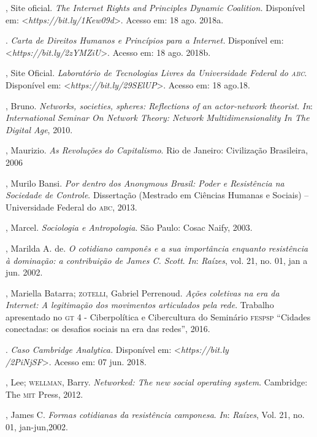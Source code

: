 \begin{bibliohedra}
, Site oficial. \emph{The Internet Rights and Principles Dynamic
Coalition.} Disponível em: \textless{}\emph{https://bit.ly/1Kew09d}\textgreater{}. Acesso em: 18 ago. 2018a.

\titidem. \emph{Carta de Direitos Humanos e Princípios para
a Internet.} Disponível em: \textless{}\emph{https://bit.ly/2zYMZiU}\textgreater{}. Acesso em: 18 ago. 2018b.

, Site Oficial. \emph{Laboratório de Tecnologias Livres da
Universidade Federal do \textsc{abc}}. Disponível em: \textless{}\emph{https://bit.ly/29SElUP}\textgreater{}. Acesso em: 18 ago.18.

, Bruno. \emph{Networks, societies, spheres: Reflections of an
actor-network theorist}. \emph{In}: \emph{International Seminar On Network Theory:
Network Multidimensionality In The Digital Age}, 2010.

, Maurizio. \emph{As Revoluções do Capitalismo}. Rio de
Janeiro: Civilização Brasileira, 2006

, Murilo Bansi. \emph{Por dentro dos Anonymous Brasil: Poder e
Resistência na Sociedade de Controle}. Dissertação (Mestrado em Ciências
Humanas e Sociais) -- Universidade Federal do \textsc{abc}, 2013.

, Marcel. \emph{Sociologia e Antropologia}. São Paulo: Cosac
Naify, 2003.

, Marilda A. de. \emph{O cotidiano camponês e a sua importância enquanto
resistência à dominação: a contribuição de James C. Scott}. \emph{In}:
\emph{Raízes}, vol. 21, no. 01, jan a jun. 2002.

, Mariella Batarra; \textsc{zotelli}, Gabriel Perrenoud. \emph{Ações
coletivas na era da Internet: A legitimação dos movimentos articulados
pela rede}. Trabalho apresentado no \textsc{gt} 4 - Ciberpolítica e Cibercultura
do Seminário \textsc{fespsp} ``Cidades conectadas: os desafios sociais na era das
redes'', 2016.

. \emph{Caso Cambridge Analytica.} Disponível em:
\textless{}\emph{https://bit.ly\\/2PiNjSF}\textgreater{}. Acesso em: 07 jun. 2018.

, Lee; \textsc{wellman}, Barry. \emph{Networked: The new social
operating system}. Cambridge: The \textsc{mit} Press, 2012.

, James C. \emph{Formas cotidianas da resistência camponesa}. \emph{In}:
\emph{Raízes}, Vol. 21, no. 01, jan-jun,2002.


\end{bibliohedra}
